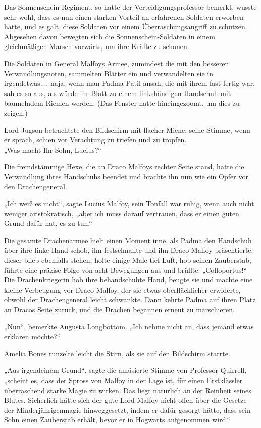 {Das Sonnenschein Regiment, so hatte der Verteidigungsprofessor bemerkt, wusste sehr wohl, dass es nun einen starken Vorteil an erfahrenen Soldaten erworben hatte, und es galt, diese Soldaten vor einem Überraschungsangriff zu schützen. Abgesehen davon bewegten sich die Sonnenschein-Soldaten in einem gleichmäßigen Marsch vorwärts, um ihre Kräfte zu schonen.

Die Soldaten in General Malfoys Armee, zumindest die mit den besseren Verwandlungsnoten, sammelten Blätter ein und verwandelten sie in irgendetwas.... naja, wenn man Padma Patil ansah, die mit ihrem fast fertig war, sah es so aus, als würde ihr Blatt zu einem linkshändigen Handschuh mit baumelndem Riemen werden. (Das Fenster hatte hineingezoomt, um dies zu zeigen.)

Lord Jugson betrachtete den Bildschirm mit flacher Miene; seine Stimme, wenn er sprach, schien vor Verachtung zu triefen und zu tropfen.\\ „Was macht Ihr Sohn, Lucius?“

Die fremdstämmige Hexe, die an Draco Malfoys rechter Seite stand, hatte die Verwandlung ihres Handschuhs beendet und brachte ihn nun wie ein Opfer vor den Drachengeneral.

„Ich weiß es nicht“, sagte Lucius Malfoy, sein Tonfall war ruhig, wenn auch nicht weniger aristokratisch, „aber ich muss darauf vertrauen, dass er einen guten Grund dafür hat, es zu tun.“

Die gesamte Drachenarmee hielt einen Moment inne, als Padma den Handschuh über ihre linke Hand schob, ihn festschnallte und ihn Draco Malfoy präsentierte; dieser blieb ebenfalls stehen, holte einige Male tief Luft, hob seinen Zauberstab, führte eine präzise Folge von acht Bewegungen aus und brüllte: „Colloportus!“\\ Die Drachenkriegerin hob ihre behandschuhte Hand, beugte sie und machte eine kleine Verbeugung vor Draco Malfoy, der sie etwas oberflächlicher erwiderte, obwohl der Drachengeneral leicht schwankte. Dann kehrte Padma auf ihren Platz an Dracos Seite zurück, und die Drachen begannen erneut zu marschieren.

„Nun“, bemerkte Augusta Longbottom. „Ich nehme nicht an, dass jemand etwas erklären möchte?“

Amelia Bones runzelte leicht die Stirn, als sie auf den Bildschirm starrte.

„Aus irgendeinem Grund“, sagte die amüsierte Stimme von Professor Quirrell, „scheint es, dass der Spross von Malfoy in der Lage ist, für einen Erstklässler überraschend starke Magie zu wirken. Das liegt natürlich an der Reinheit seines Blutes. Sicherlich hätte sich der gute Lord Malfoy nicht offen über die Gesetze der Minderjährigenmagie hinweggesetzt, indem er dafür gesorgt hätte, dass sein Sohn einen Zauberstab erhält, bevor er in Hogwarts aufgenommen wird.“

}
